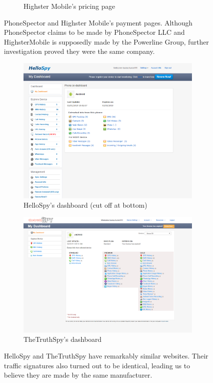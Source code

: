 \documentclass[acmtog]{acmart}
\begin{document}
\begin{figure}
\begin{subfigure}{0.8\columnwidth}
		\caption{Highster Mobile's pricing page}
	\end{subfigure}
	\caption{PhoneSpector and Highster Mobile's payment pages. Although 
	PhoneSpector claims to be made by PhoneSpector LLC and HighsterMobile is 
	supposedly made by the Powerline Group, further investigation proved they 
	were the same company.}
	\label{fig:ilfmobiles}
\end{figure}

\begin{figure}
	\centering
	\begin{subfigure}{0.8\columnwidth}
		\centering
		\includegraphics[width=0.9\linewidth]{../images/hellospy.png}
		\caption{HelloSpy's dashboard (cut off at bottom)}
		\label{fig:hellospy}
	\end{subfigure}%
	\begin{subfigure}{0.8\columnwidth}
		\centering
		\includegraphics[width=0.9\linewidth]{../images/thetruthspy.png}
		\caption{TheTruthSpy's dashboard}
		\label{fig:truthspy}
	\end{subfigure}
	\caption{HelloSpy and TheTruthSpy have remarkably similar websites. Their 
	traffic signatures also turned out to be identical, leading us to believe 
	they are made by the same manufacturer.}
	\label{fig:hellospy_thetruthspy}
\end{figure}
\end{document}
